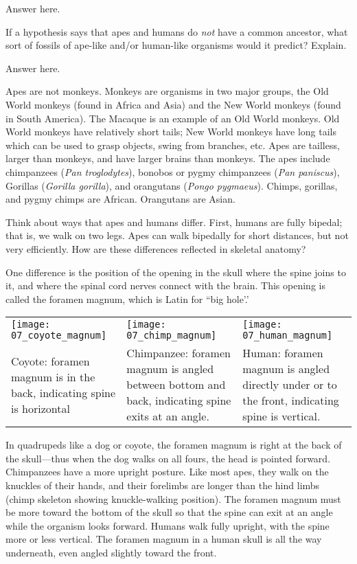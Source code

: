 \documentclass[12pt, hidelinks]{exam}
\newcommand*\AnswerBox[2]{%
    \parbox[t][#1]{0.92\textwidth}{%
    \begin{solution}#2\end{solution}}
}
\begin{document}
\begin{questions}
\AnswerBox{3\baselineskip}{%
Answer here.
}

\question[2]
If a hypothesis says that apes and humans do \emph{not} have a
common ancestor, what sort of fossils of ape-like and/or human-like
organisms would it predict? Explain.

\AnswerBox{3\baselineskip}{%
Answer here.
}

Apes are not monkeys. Monkeys are organisms in two major groups, the Old
World monkeys (found in Africa and Asia) and the New World monkeys
(found in South America). The Macaque is an example of an Old World monkeys. Old World monkeys have relatively short tails;
New World monkeys have long tails which can be used to grasp objects,
swing from branches, etc. Apes are tailless, larger than monkeys, and
have larger brains than monkeys. The apes include chimpanzees (\emph{Pan
troglodytes}), bonobos or pygmy chimpanzees (\emph{Pan paniscus}),
Gorillas (\emph{Gorilla gorilla}), and orangutans (\emph{Pongo
pygmaeus}). Chimps, gorillas, and pygmy chimps are African. Orangutans are
Asian.

Think about ways that apes and humans differ. First, humans are fully
bipedal; that is, we walk on two legs. Apes can walk bipedally for short
distances, but not very efficiently. How are these differences reflected
in skeletal anatomy?

One difference is the position of the opening in the skull where the
spine joins to it, and where the spinal cord nerves connect with the
brain. This opening is called the foramen magnum, which is Latin for
``big hole'.'

\begin{longtable}[c]{@{}L{0.31\textwidth}L{0.31\textwidth}L{0.31\textwidth}@{}}
\texttt{[image: 07\_coyote\_magnum]} &
\texttt{[image: 07\_chimp\_magnum]} &
\texttt{[image: 07\_human\_magnum]} \\
Coyote: foramen magnum is in the back, indicating spine is
horizontal & 
Chimpanzee: foramen magnum is angled between bottom
and back, indicating spine exits at an angle. & 
Human: foramen
magnum is angled directly under or to the front, indicating spine is
vertical.\tabularnewline

\end{longtable}

In quadrupeds like a dog or coyote, the foramen magnum is right at the
back of the skull—thus when the dog walks on all fours, the head is
pointed forward. Chimpanzees have a more upright posture. Like most
apes, they walk on the knuckles of their hands, and their forelimbs are
longer than the hind limbs (chimp skeleton showing knuckle-walking
position). The foramen magnum must be more toward the bottom of the
skull so that the spine can exit at an angle while the organism looks
forward. Humans walk fully upright, with the spine more or less
vertical. The foramen magnum in a human skull is all the way underneath,
even angled slightly toward the front.


\end{questions}
\end{document}
